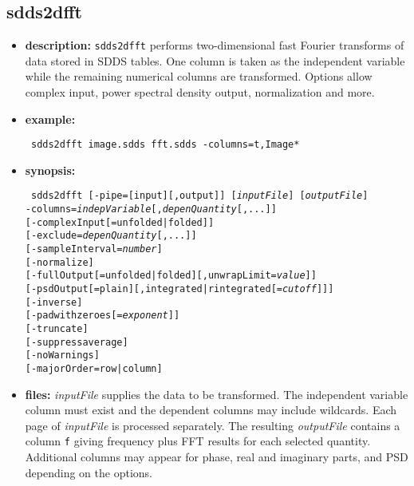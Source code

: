 \newpage
\subsection{sdds2dfft}
\label{sdds2dfft}

\begin{itemize}
\item {\bf description:}
{\tt sdds2dfft} performs two-dimensional fast Fourier transforms of data stored in SDDS tables. One column is taken as the independent variable while the remaining numerical columns are transformed. Options allow complex input, power spectral density output, normalization and more.

\item {\bf example:}
\begin{flushleft}{\tt
sdds2dfft image.sdds fft.sdds -columns=t,Image*
}\end{flushleft}

\item {\bf synopsis:}
\begin{flushleft}{\tt
sdds2dfft [-pipe=[input][,output]] [{\em inputFile}] [{\em outputFile}]\\
  -columns={\em indepVariable}[,{\em depenQuantity}[,...]]\\
  {}[-complexInput[=unfolded|folded]]\\
  {}[-exclude={\em depenQuantity}[,...]]\\
  {}[-sampleInterval={\em number}]\\
  {}[-normalize]\\
  {}[-fullOutput[=unfolded|folded][,unwrapLimit={\em value}]]\\
  {}[-psdOutput[=plain][,{integrated|rintegrated[={\em cutoff}]}]]\\
  {}[-inverse]\\
  {}[-padwithzeroes[={\em exponent}]]\\
  {}[-truncate]\\
  {}[-suppressaverage]\\
  {}[-noWarnings]\\
  {}[-majorOrder=row|column]
}\end{flushleft}

\item {\bf files:}
{\em inputFile} supplies the data to be transformed. The independent variable column must exist and the dependent columns may include wildcards. Each page of {\em inputFile} is processed separately. The resulting {\em outputFile} contains a column {\tt f} giving frequency plus FFT results for each selected quantity. Additional columns may appear for phase, real and imaginary parts, and PSD depending on the options.


\end{itemize}
